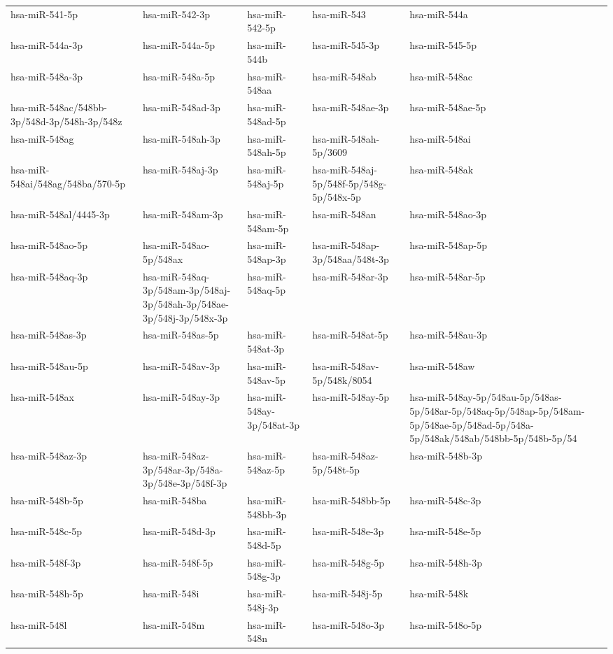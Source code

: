 \begin{longtable}{lllll}
hsa-miR-541-5p & hsa-miR-542-3p & hsa-miR-542-5p & hsa-miR-543 & hsa-miR-544a \\
hsa-miR-544a-3p & hsa-miR-544a-5p & hsa-miR-544b & hsa-miR-545-3p & hsa-miR-545-5p \\
hsa-miR-548a-3p & hsa-miR-548a-5p & hsa-miR-548aa & hsa-miR-548ab & hsa-miR-548ac \\
hsa-miR-548ac/548bb-3p/548d-3p/548h-3p/548z & hsa-miR-548ad-3p & hsa-miR-548ad-5p & hsa-miR-548ae-3p & hsa-miR-548ae-5p \\
hsa-miR-548ag & hsa-miR-548ah-3p & hsa-miR-548ah-5p & hsa-miR-548ah-5p/3609 & hsa-miR-548ai \\
hsa-miR-548ai/548ag/548ba/570-5p & hsa-miR-548aj-3p & hsa-miR-548aj-5p & hsa-miR-548aj-5p/548f-5p/548g-5p/548x-5p & hsa-miR-548ak \\
hsa-miR-548al/4445-3p & hsa-miR-548am-3p & hsa-miR-548am-5p & hsa-miR-548an & hsa-miR-548ao-3p \\
hsa-miR-548ao-5p & hsa-miR-548ao-5p/548ax & hsa-miR-548ap-3p & hsa-miR-548ap-3p/548aa/548t-3p & hsa-miR-548ap-5p \\
hsa-miR-548aq-3p & hsa-miR-548aq-3p/548am-3p/548aj-3p/548ah-3p/548ae-3p/548j-3p/548x-3p & hsa-miR-548aq-5p & hsa-miR-548ar-3p & hsa-miR-548ar-5p \\
hsa-miR-548as-3p & hsa-miR-548as-5p & hsa-miR-548at-3p & hsa-miR-548at-5p & hsa-miR-548au-3p \\
hsa-miR-548au-5p & hsa-miR-548av-3p & hsa-miR-548av-5p & hsa-miR-548av-5p/548k/8054 & hsa-miR-548aw \\
hsa-miR-548ax & hsa-miR-548ay-3p & hsa-miR-548ay-3p/548at-3p & hsa-miR-548ay-5p & hsa-miR-548ay-5p/548au-5p/548as-5p/548ar-5p/548aq-5p/548ap-5p/548am-5p/548ae-5p/548ad-5p/548a-5p/548ak/548ab/548bb-5p/548b-5p/54 \\
hsa-miR-548az-3p & hsa-miR-548az-3p/548ar-3p/548a-3p/548e-3p/548f-3p & hsa-miR-548az-5p & hsa-miR-548az-5p/548t-5p & hsa-miR-548b-3p \\
hsa-miR-548b-5p & hsa-miR-548ba & hsa-miR-548bb-3p & hsa-miR-548bb-5p & hsa-miR-548c-3p \\
hsa-miR-548c-5p & hsa-miR-548d-3p & hsa-miR-548d-5p & hsa-miR-548e-3p & hsa-miR-548e-5p \\
hsa-miR-548f-3p & hsa-miR-548f-5p & hsa-miR-548g-3p & hsa-miR-548g-5p & hsa-miR-548h-3p \\
hsa-miR-548h-5p & hsa-miR-548i & hsa-miR-548j-3p & hsa-miR-548j-5p & hsa-miR-548k \\
hsa-miR-548l & hsa-miR-548m & hsa-miR-548n & hsa-miR-548o-3p & hsa-miR-548o-5p \\

\end{longtable}
